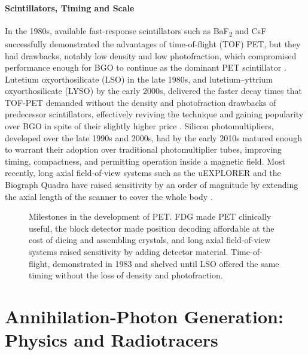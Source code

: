 \paragraph{Scintillators, Timing and Scale}
In the 1980s, available fast-response scintillators such as BaF\textsubscript{2} and CsF successfully demonstrated the advantages of time-of-flight (TOF) PET, but they had drawbacks, notably low density and low photofraction, which compromised performance enough for BGO to continue as the dominant PET scintillator \cite{Moses2007}.
Lutetium oxyorthosilicate (LSO) in the late 1980s, and lutetium--yttrium oxyorthosilicate (LYSO) by the early 2000s, delivered the faster decay times that TOF-PET demanded without the density and photofraction drawbacks of predecessor scintillators, effectively reviving the technique and gaining popularity over BGO in spite of their slightly higher price \cite{Moses2007}.
Silicon photomultipliers, developed over the late 1990s and 2000s, had by the early 2010s matured enough to warrant their adoption over traditional photomultiplier tubes, improving timing, compactness, and permitting operation inside a magnetic field.
Most recently, long axial field-of-view systems such as the uEXPLORER and the Biograph Quadra have raised sensitivity by an order of magnitude by extending the axial length of the scanner to cover the whole body \cite{Vandenberghe2020, SLHD2021}.

\begin{figure}[tbp]
	\centering
	
	\caption[Broad milestones in the development of PET]{%
		Milestones in the development of PET.
		FDG made PET clinically useful, the block detector made position decoding affordable at the cost of dicing and assembling crystals, and long axial field-of-view systems raised sensitivity by adding detector material.
		Time-of-flight, demonstrated in 1983 and shelved until LSO offered the same timing without the loss of density and photofraction.}
	\label{fig:pet-timeline}
\end{figure}

\section{Annihilation-Photon Generation: Physics and Radiotracers}
\label{sec:photon-generation}

